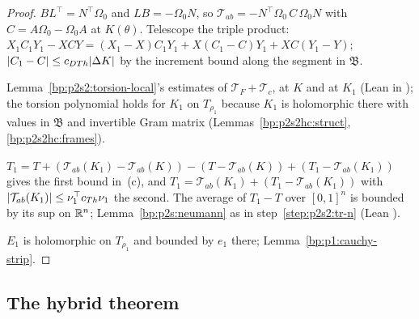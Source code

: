 \begin{proof}
\label{step:p2s2hc:to-ab}
$BL^\top=N^\top\Omega_0$ and $LB=-\Omega_0N$, so $\mathcal T_{ab}=-N^\top\Omega_0\,C\,\Omega_0N$ with $C=A\Omega_0-\Omega_0A$ at $K(\theta)$. Telescope the triple product:
$X_1C_1Y_1-XCY=(X_1-X)C_1Y_1+X(C_1-C)Y_1+XC(Y_1-Y)$; $\lvert C_1-C\rvert\le c_{DTh}\lvert \Delta K\rvert$ by the increment bound along the segment in $\mathfrak B$.

\label{step:p2s2hc:to-loc}
Lemma~\ref{bp:p2s2:torsion-local}'s estimates of $\mathcal T_F+\mathcal T_c$, at $K$ and at $K_1$ (Lean
 in ); the torsion
polynomial holds for $K_1$ on $T_{\rho_1}$ because $K_1$ is holomorphic there with values in $\mathfrak B$ and invertible Gram matrix
(Lemmas~\ref{bp:p2s2hc:struct}, \ref{bp:p2s2hc:frames}).

\label{step:p2s2hc:to-avg}
$T_1=T+(\mathcal T_{ab}(K_1)-\mathcal T_{ab}(K))-(T-\mathcal T_{ab}(K))+(T_1-\mathcal T_{ab}(K_1))$ gives the first bound in~(c), and
$T_1=\mathcal T_{ab}(K_1)+(T_1-\mathcal T_{ab}(K_1))$ with $\lvert \mathcal T_{ab}(K_1)\rvert\le\nu_1^\top c_{Th}\nu_1$ the second. The average of $T_1-T$ over $[0,1]^n$ is bounded by its
sup on $\mathbb{R}^n$; Lemma~\ref{bp:p2s:neumann} as in step~\ref{step:p2s2:tr-n} (Lean ).

\label{step:p2s2hc:to-c}
$E_1$ is holomorphic on $T_{\rho_1}$ and bounded by $e_1$ there; Lemma~\ref{bp:p1:cauchy-strip}.
\end{proof}

\subsection{The hybrid theorem}\label{bp:p2s2hc:sec-g1}

